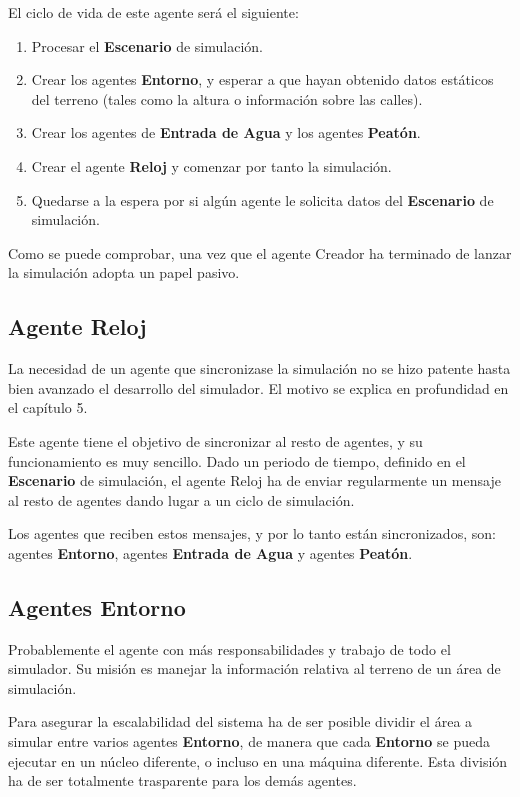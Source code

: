 El ciclo de vida de este agente será el siguiente:

\begin{enumerate}
 \item Procesar el {\bf Escenario} de simulación.
 \item Crear los agentes {\bf Entorno}, y esperar a que hayan obtenido datos
estáticos del terreno (tales como la altura o información sobre las calles).
 \item Crear los agentes de {\bf Entrada de Agua} y los agentes {\bf Peatón}.
 \item Crear el agente {\bf Reloj} y comenzar por tanto la simulación.
 \item Quedarse a la espera por si algún agente le solicita datos del
{\bf Escenario} de simulación.
\end{enumerate}

Como se puede comprobar, una vez que el agente Creador ha terminado de lanzar
la simulación adopta un papel pasivo.

\subsection*{Agente Reloj}

La necesidad de un agente que sincronizase la simulación no se hizo patente
hasta bien avanzado el desarrollo del simulador. El motivo se explica en
profundidad en el capítulo 5. %

Este agente tiene el objetivo de sincronizar al resto de agentes, y su
funcionamiento es muy sencillo. Dado un periodo de tiempo, definido en el
{\bf Escenario} de simulación, el agente Reloj ha de enviar regularmente un
mensaje al resto de agentes dando lugar a un ciclo de simulación.

Los agentes que reciben estos mensajes, y por lo tanto están sincronizados,
son: agentes {\bf Entorno}, agentes {\bf Entrada de Agua} y agentes {\bf
Peatón}.

\subsection*{Agentes Entorno}

Probablemente el agente con más responsabilidades y trabajo de todo el
simulador. Su misión es manejar la información relativa al terreno de un área
de simulación.

Para asegurar la escalabilidad del sistema ha de ser posible dividir el área a
simular entre varios agentes {\bf Entorno}, de manera que cada {\bf Entorno} se
pueda ejecutar en un núcleo diferente, o incluso en una máquina diferente. Esta
división ha de ser totalmente trasparente para los demás agentes.

